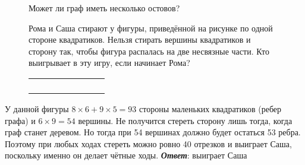 \begin{figure}[H]
\begin{minipage}{0.65\linewidth}\setlength{\parindent}{1.5em}
    \begin{ques}
     Может ли граф иметь несколько остовов?
    \end{ques}

    \begin{thm}
    Рома и Саша стирают у фигуры, приведённой на рисунке по одной стороне квадратиков. Нельзя стирать вершины квадратиков и сторону так, чтобы фигура распалась на две несвязные части. Кто выигрывает в эту игру, если начинает Рома?
    \end{thm}
\end{minipage}
\hfill
\begin{minipage}{0.3\linewidth}

        \begin{tabular}{ | m{0em} | m{0em} | m{0em} | m{0em} | m{0em} | m{0em} | m{0em} | m{0em} | } 
    \hline
   &  &  &  &  &  &  &  \\ 
     \hline
   &  &  &  &  &  &  &  \\ 
    \hline
   &  &  &  &  &  &  &  \\ 
    \hline
   &  &  &  &  &  &  &  \\ 
    \hline
   &  &  &  &  &  &  &  \\ 
    \hline
\end{tabular}
    
\end{minipage}
\end{figure} 

\begin{prf}
    У данной фигуры $8 \times 6 + 9 \times 5 = 93$ стороны маленьких квадратиков (ребер графа) и $6 \times 9 = 54$ вершины. Не получится стереть сторону лишь тогда, когда граф станет деревом. Но тогда при 54 вершинах должно будет остаться 53 ребра. Поэтому при любых ходах стереть можно ровно 40 отрезков и выиграет Саша, поскольку именно он делает чётные ходы. \textbf{\textit{Ответ}}: выиграет Саша
\end{prf}